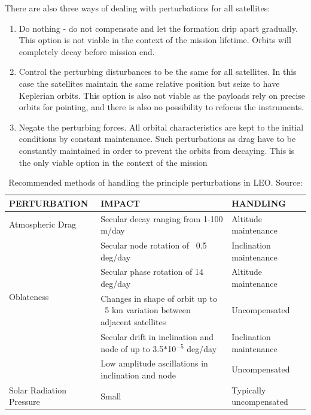 There are also three ways of dealing with perturbations for all satellites:

\begin{enumerate}
	\item Do nothing - do not compensate and let the formation drip apart gradually. This option is not viable in the context of the mission lifetime. Orbits will completely decay before mission end.
	\item Control the perturbing disturbances to be the same for all satellites. In this case the satellites maintain the same relative position but seize to have Keplerian orbits. This option is also not viable as the payloads rely on precise orbits for pointing, and there is also no possibility to refocus the instruments.
	\item Negate the perturbing forces. All orbital characteristics are kept to the initial conditions by constant maintenance. Such perturbations as drag have to be constantly maintained in order to prevent the orbits from decaying. This is the only viable option in the context of the mission
\end{enumerate}

\begin{table}
	\centering
	
		\begin{tabular}{p{5cm}|p{5cm}|p{5cm}}
	\textbf{PERTURBATION} & \textbf{IMPACT} & \textbf{HANDLING} \\
		\hline \hline
		Atmospheric Drag & Secular decay ranging from 1-100 m/day & Altitude maintenance \\ \hline
		\multirow{4}{*}{Oblateness} & Secular node rotation of ~0.5 deg/day & Inclination maintenance \\ \cline{2-3}
		 & Secular phase rotation of 14 deg/day & Altitude maintenance \\ \cline{2-3}
		 & Changes in shape of orbit up to ~5 km variation between adjacent satellites & Uncompensated \\
    \hline
		\multirow{2}{*}{Solar/Lunar} & Secular drift in inclination and node of up to 3.5$*$10$^{-5}$ deg/day & Inclination maintenance\\ \cline{2-3}
		 & Low amplitude ascillations in inclination and node & Uncompensated \\ \hline
		Solar Radiation Pressure & Small & Typically uncompensated
	\end{tabular}
	\caption{Recommended methods of handling the principle perturbations in LEO. Source: \cite{constDesign}}
	\label{table:station}
\end{table}

